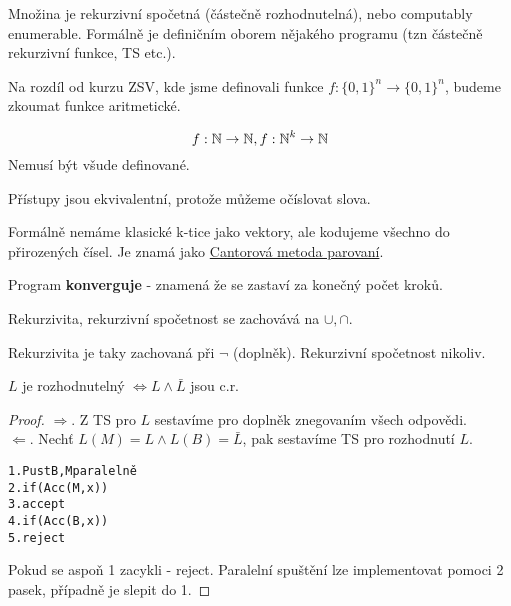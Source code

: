 \begin{definition}
	Množina je rekurzivní spočetná (částečně rozhodnutelná), nebo computably enumerable.
	Formálně je definičním oborem nějakého programu (tzn částečně rekurzivní funkce, TS etc.).
\end{definition}

\begin{note}
	Na rozdíl od kurzu ZSV, kde jsme definovali funkce $f:\{0, 1\}^n \to \{0, 1\}^n$,
	budeme zkoumat funkce aritmetické.

	\[ f:\operatorname{\mathbb{N}} \to \operatorname{\mathbb{N}}, f:\operatorname{\mathbb{N}}^k \to \operatorname{\mathbb{N}} \]
	Nemusí být všude definované.

	Přístupy jsou ekvivalentní, protože můžeme očíslovat slova.
\end{note}

\begin{note}
	Formálně nemáme klasické k-tice jako vektory, ale kodujeme všechno do přirozených čísel.
	Je znamá jako \href{https://en.wikipedia.org/wiki/Pairing_function}{Cantorová metoda parovaní}.
\end{note}

\begin{notation}[Konvergence]
	Program \textbf{konverguje} - znamená že se zastaví za konečný počet kroků.
\end{notation}

\begin{reminder}
	Rekurzivita, rekurzivní spočetnost se zachovává na $\cup, \cap$.

	Rekurzivita je taky zachovaná při $\neg$ (doplněk).
	Rekurzivní spočetnost nikoliv.
\end{reminder}

\begin{theorem}[Postova]\label{post}
	$L$ je rozhodnutelný $ \iff L \land \bar{L} $ jsou c.r.
\end{theorem}
\begin{proof}
$ \Rightarrow $. Z TS pro $L$ sestavíme pro doplněk znegovaním všech odpovědi. \\
$ \Leftarrow $. Nechť $L(M) = L \land L(B) = \bar{L} $, pak sestavíme TS pro rozhodnutí $L$.

\begin{alltt}
1. Pust B, M paralelně
2. if(Acc(M, x))
3. \tab accept
4. if(Acc(B, x))
5. reject
\end{alltt}

Pokud se aspoň 1 zacykli - reject. Paralelní spuštění lze implementovat pomoci 2 pasek, případně je slepit do 1.
\end{proof}

